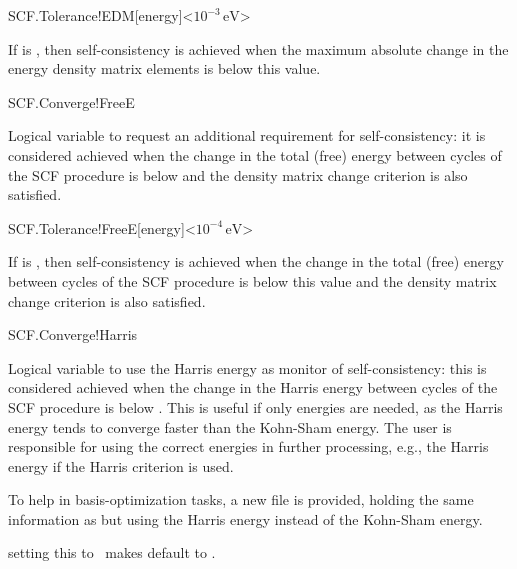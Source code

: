\begin{fdfentry}{SCF.Tolerance!EDM}[energy]<$10^{-3}\,\mathrm{eV}$>

  If  is \fdftrue, then self-consistency is
  achieved when the maximum absolute change in the energy density
  matrix elements is below this value.
  
\end{fdfentry}


\begin{fdflogicalF}{SCF.Converge!FreeE}

  Logical variable to request an additional requirement for
  self-consistency: it is considered achieved when the change in the
  total (free) energy between cycles of the SCF procedure is below
   and the density matrix change criterion is
  also satisfied.

\end{fdflogicalF}

\begin{fdfentry}{SCF.Tolerance!FreeE}[energy]<$10^{-4}\,\mathrm{eV}$>

  If  is \fdftrue, then self-consistency is
  achieved when the change in the total (free) energy between cycles
  of the SCF procedure is below this value and the density matrix
  change criterion is also satisfied.

\end{fdfentry}

\begin{fdflogicalF}{SCF.Converge!Harris}

  Logical variable to use the Harris energy as monitor of
  self-consistency: this is considered achieved when the change in the
  Harris energy between cycles of the SCF procedure is below
  . This is useful if only
  energies are needed, as the Harris energy tends to converge faster
  than the Kohn-Sham energy. The user is responsible for using the
  correct energies in further processing, e.g., the Harris energy if
  the Harris criterion is used.

  To help in basis-optimization tasks, a new file
   is provided, holding the same
  information as  but using the Harris energy
  instead of the Kohn-Sham energy.

  \note setting this to \fdftrue\ makes 
   default to \fdffalse.

\end{fdflogicalF}

